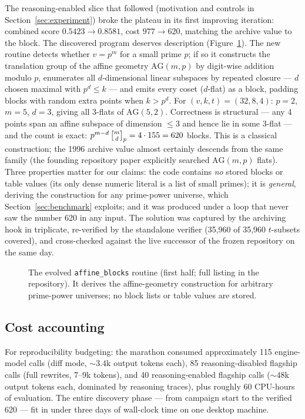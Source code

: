 The reasoning-enabled slice that followed (motivation and controls in
Section~\ref{sec:experiment}) broke the plateau in its first
improving iteration: combined score $0.5423 \to 0.8581$, cost
$977 \to 620$, matching the archive value to the block. The
discovered program deserves description
(Figure~\ref{fig:affineblocks}). The new routine detects whether
$v = p^m$ for a small prime $p$; if so it constructs the translation
group of the affine geometry $\mathrm{AG}(m,p)$ by digit-wise
addition modulo $p$, enumerates all $d$-dimensional linear subspaces
by repeated closure --- $d$ chosen maximal with $p^d \le k$ --- and
emits every coset ($d$-flat) as a block, padding blocks with random
extra points when $k > p^d$. For $(v,k,t)=(32,8,4)$: $p=2$, $m=5$,
$d=3$, giving all 3-flats of $\mathrm{AG}(5,2)$. Correctness is
structural --- any 4 points span an affine subspace of dimension
$\le 3$ and hence lie in some 3-flat --- and the count is exact:
$p^{m-d}\,\gauss{m}{d}_p = 4 \cdot 155 = 620$ blocks. This is a
classical construction; the 1996 archive value almost certainly
descends from the same family (the founding repository paper
\cite{gordon1995new} explicitly searched $\mathrm{AG}(m,p)$ flats).
Three properties matter for our claims: the code contains \emph{no}
stored blocks or table values (its only dense numeric literal is a
list of small primes); it is \emph{general}, deriving the
construction for any prime-power universe, which
Section~\ref{sec:benchmark} exploits; and it was produced under a
loop that never saw the number 620 in any input. The solution was
captured by the archiving hook in triplicate, re-verified by the
standalone verifier (35{,}960 of 35{,}960 $t$-subsets covered), and
cross-checked against the live successor of the frozen repository on
the same day.

\begin{figure}

\caption{The evolved \texttt{affine\_blocks} routine (first half;
full listing in the repository). It derives the affine-geometry
construction for arbitrary prime-power universes; no block lists or
table values are stored.}
\label{fig:affineblocks}
\end{figure}

\subsection{Cost accounting}

For reproducibility budgeting: the marathon consumed approximately
115 engine-model calls (diff mode, ${\sim}3.4$k output tokens each),
85 reasoning-disabled flagship calls (full rewrites, 7--9k tokens),
and 40 reasoning-enabled flagship calls (${\sim}48$k output tokens
each, dominated by reasoning traces), plus roughly 60 CPU-hours of
evaluation. The entire discovery phase --- from campaign start to the
verified 620 --- fit in under three days of wall-clock time on one
desktop machine.
